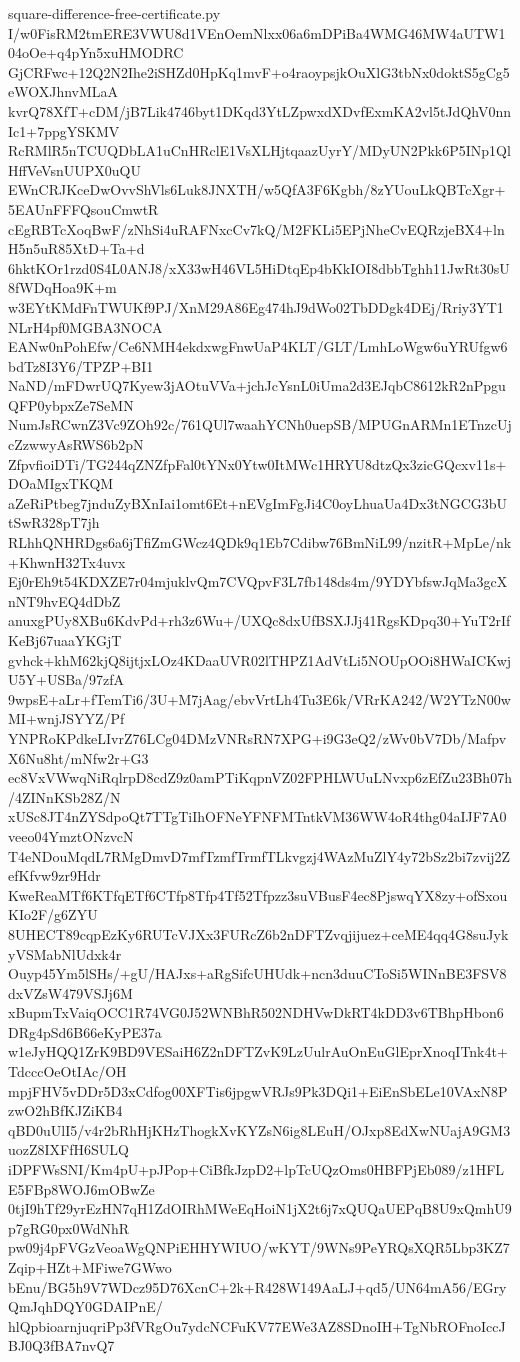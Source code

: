 \documentclass[11pt]{article}
\theoremstyle{definition}
\theoremstyle{remark}
\begin{document}
\begin{filecontents*}[overwrite]{square-difference-free-certificate.py}
I/w0FisRM2tmERE3VWU8d1VEnOemNlxx06a6mDPiBa4WMG46MW4aUTW104oOe+q4pYn5xuHMODRC
GjCRFwc+12Q2N2Ihe2iSHZd0HpKq1mvF+o4raoypsjkOuXlG3tbNx0doktS5gCg5eWOXJhnvMLaA
kvrQ78XfT+cDM/jB7Lik4746byt1DKqd3YtLZpwxdXDvfExmKA2vl5tJdQhV0nnIc1+7ppgYSKMV
RcRMlR5nTCUQDbLA1uCnHRclE1VsXLHjtqaazUyrY/MDyUN2Pkk6P5INp1QlHffVeVsnUUPX0uQU
EWnCRJKceDwOvvShVls6Luk8JNXTH/w5QfA3F6Kgbh/8zYUouLkQBTcXgr+5EAUnFFFQsouCmwtR
cEgRBTcXoqBwF/zNhSi4uRAFNxcCv7kQ/M2FKLi5EPjNheCvEQRzjeBX4+lnH5n5uR85XtD+Ta+d
6hktKOr1rzd0S4L0ANJ8/xX33wH46VL5HiDtqEp4bKkIOI8dbbTghh11JwRt30sU8fWDqHoa9K+m
w3EYtKMdFnTWUKf9PJ/XnM29A86Eg474hJ9dWo02TbDDgk4DEj/Rriy3YT1NLrH4pf0MGBA3NOCA
EANw0nPohEfw/Ce6NMH4ekdxwgFnwUaP4KLT/GLT/LmhLoWgw6uYRUfgw6bdTz8I3Y6/TPZP+BI1
NaND/mFDwrUQ7Kyew3jAOtuVVa+jchJcYsnL0iUma2d3EJqbC8612kR2nPpguQFP0ybpxZe7SeMN
NumJsRCwnZ3Vc9ZOh92c/761QUl7waahYCNh0uepSB/MPUGnARMn1ETnzcUjcZzwwyAsRWS6b2pN
ZfpvfioiDTi/TG244qZNZfpFal0tYNx0Ytw0ItMWc1HRYU8dtzQx3zicGQcxv11s+DOaMIgxTKQM
aZeRiPtbeg7jnduZyBXnIai1omt6Et+nEVgImFgJi4C0oyLhuaUa4Dx3tNGCG3bUtSwR328pT7jh
RLhhQNHRDgs6a6jTfiZmGWcz4QDk9q1Eb7Cdibw76BmNiL99/nzitR+MpLe/nk+KhwnH32Tx4uvx
Ej0rEh9t54KDXZE7r04mjuklvQm7CVQpvF3L7fb148ds4m/9YDYbfswJqMa3gcXnNT9hvEQ4dDbZ
anuxgPUy8XBu6KdvPd+rh3z6Wu+/UXQc8dxUfBSXJJj41RgsKDpq30+YuT2rIfKeBj67uaaYKGjT
gvhck+khM62kjQ8ijtjxLOz4KDaaUVR02lTHPZ1AdVtLi5NOUpOOi8HWaICKwjU5Y+USBa/97zfA
9wpsE+aLr+fTemTi6/3U+M7jAag/ebvVrtLh4Tu3E6k/VRrKA242/W2YTzN00wMI+wnjJSYYZ/Pf
YNPRoKPdkeLIvrZ76LCg04DMzVNRsRN7XPG+i9G3eQ2/zWv0bV7Db/MafpvX6Nu8ht/mNfw2r+G3
ec8VxVWwqNiRqlrpD8cdZ9z0amPTiKqpnVZ02FPHLWUuLNvxp6zEfZu23Bh07h/4ZINnKSb28Z/N
xUSc8JT4nZYSdpoQt7TTgTiIhOFNeYFNFMTntkVM36WW4oR4thg04aIJF7A0veeo04YmztONzvcN
T4eNDouMqdL7RMgDmvD7mfTzmfTrmfTLkvgzj4WAzMuZlY4y72bSz2bi7zvij2ZefKfvw9zr9Hdr
KweReaMTf6KTfqETf6CTfp8Tfp4Tf52Tfpzz3suVBusF4ec8PjswqYX8zy+ofSxouKIo2F/g6ZYU
8UHECT89cqpEzKy6RUTcVJXx3FURcZ6b2nDFTZvqjijuez+ceME4qq4G8suJykyVSMabNlUdxk4r
Ouyp45Ym5lSHs/+gU/HAJxs+aRgSifcUHUdk+ncn3duuCToSi5WINnBE3FSV8dxVZsW479VSJj6M
xBupmTxVaiqOCC1R74VG0J52WNBhR502NDHVwDkRT4kDD3v6TBhpHbon6DRg4pSd6B66eKyPE37a
w1eJyHQQ1ZrK9BD9VESaiH6Z2nDFTZvK9LzUulrAuOnEuGlEprXnoqITnk4t+TdcccOeOtIAc/OH
mpjFHV5vDDr5D3xCdfog00XFTis6jpgwVRJs9Pk3DQi1+EiEnSbELe10VAxN8PzwO2hBfKJZiKB4
qBD0uUlI5/v4r2bRhHjKHzThogkXvKYZsN6ig8LEuH/OJxp8EdXwNUajA9GM3uozZ8IXFfH6SULQ
iDPFWsSNI/Km4pU+pJPop+CiBfkJzpD2+lpTcUQzOms0HBFPjEb089/z1HFLE5FBp8WOJ6mOBwZe
0tjI9hTf29yrEzHN7qH1ZdOIRhMWeEqHoiN1jX2t6j7xQUQaUEPqB8U9xQmhU9p7gRG0px0WdNhR
pw09j4pFVGzVeoaWgQNPiEHHYWIUO/wKYT/9WNs9PeYRQsXQR5Lbp3KZ7Zqip+HZt+MFiwe7GWwo
bEnu/BG5h9V7WDcz95D76XcnC+2k+R428W149AaLJ+qd5/UN64mA56/EGryQmJqhDQY0GDAIPnE/
hlQpbioarnjuqriPp3fVRgOu7ydcNCFuKV77EWe3AZ8SDnoIH+TgNbROFnoIccJBJ0Q3fBA7nvQ7

\end{filecontents*}
\end{document}

